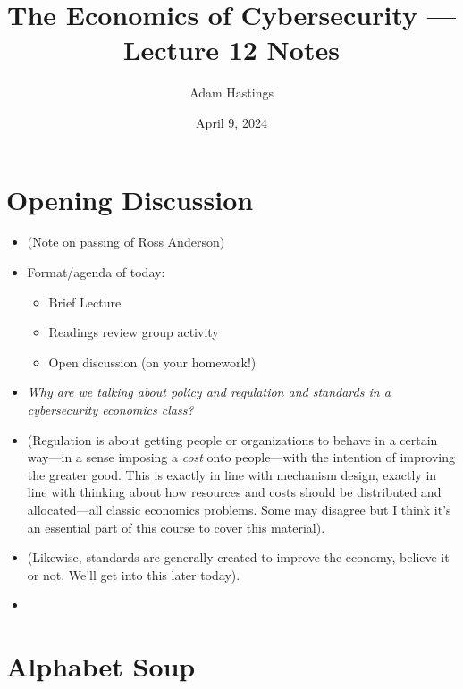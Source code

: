 \documentclass[11pt]{article}
\title{The Economics of Cybersecurity --- Lecture 12 Notes}
\date{April 9, 2024}
\author{Adam Hastings}
\begin{document}
\maketitle

\section{Opening Discussion}

\begin{itemize}
    \item (Note on passing of Ross Anderson)
    \item Format/agenda of today:
    \begin{itemize}
        \item Brief Lecture
        \item Readings review group activity
        \item Open discussion (on your homework!)
    \end{itemize}
    \item {\it Why are we talking about policy and regulation and standards in a cybersecurity economics class?}
    \item (Regulation is about getting people or organizations to behave in a certain way---in a sense imposing a {\it cost} onto people---with the intention of improving the greater good. This is exactly in line with mechanism design, exactly in line with thinking about how resources and costs should be distributed and allocated---all classic economics problems. Some may disagree but I think it's an essential part of this course to cover this material).
    \item (Likewise, standards are generally created to improve the economy, believe it or not. We'll get into this later today).
    \item 
\end{itemize}

\section{Alphabet Soup}
\end{document}
